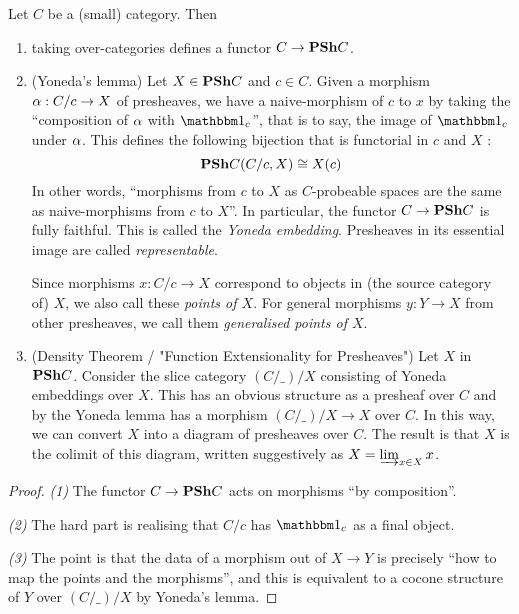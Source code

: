\documentclass{article}
\begin{document}
\begin{prop}

  Let $ C$ be a (small) category.
  Then 
  \begin{enumerate}
    \item taking over-categories defines a functor
    $C \to \mathbf{PSh} C$.
    \item (Yoneda's lemma) Let $X \in \mathbf{PSh} C$ and $c \in  C$.
    Given a morphism $\alpha : C / c \to X$ of presheaves,
    we have a naive-morphism of $c$ to $x$ by taking
    the ``composition of $\alpha$ with $\id{c}$'',
    that is to say, the image of $\id{c}$ under $\alpha$.
    This defines the following bijection that is functorial in $c$ and $X$ : 
    \[
      \mathbf{PSh} C (C / c , X) \cong X (c)
    \]
    In other words, 
    ``morphisms from $c$ to $X$ as $C$-probeable spaces
    are the same as naive-morphisms from $c$ to $X$''.
    In particular,
    the functor $C \to \mathbf{PSh} C$ is fully faithful.
    This is called the \emph{Yoneda embedding}.
    Presheaves in its essential image are called \emph{representable}.

    Since morphisms $x : C / c \to X$ correspond to objects 
    in (the source category of) $X$,
    we also call these \emph{points of $X$}.
    For general morphisms $y : Y \to X$ from other presheaves,
    we call them \emph{generalised points of $X$}.
    \item (Density Theorem / "Function Extensionality for Presheaves") 
    Let $X$ in $\mathbf{PSh} C$.
    Consider the slice category $(C / \_ ) / X$
    consisting of Yoneda embeddings over $X$.
    This has an obvious structure as a presheaf over $C$
    and by the Yoneda lemma has a morphism $(C / \_)/ X \to X$ over $C$.
    In this way, we can convert $X$ into a diagram of presheaves over $C$.
    The result is that $X$ is the colimit of this diagram,
    written suggestively as $X = \varinjlim_{x \in X} x$.
  \end{enumerate} 
\end{prop}
\begin{proof}
  \textit{(1)} The functor $C \to \mathbf{PSh} C$ acts on morphisms
  ``by composition''.

  \textit{(2)} 
  The hard part is realising that $C / c$ has $\id{c}$ as a final object.

  \textit{(3)} The point is that
  the data of a morphism out of $X \to Y$ is precisely 
  ``how to map the points and the morphisms'',
  and this is equivalent to a cocone structure of $Y$ over $(C / \_) / X$
  by Yoneda's lemma.
  
\end{proof}
\end{document}
